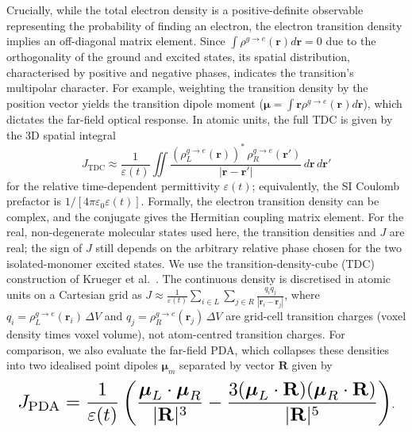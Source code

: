 \documentclass[journal=jpcbfk, manuscript=article, layout=twocolumn, doi=true]{achemso}
\begin{document}
Crucially, while the total electron density is a positive-definite observable representing the probability of finding an electron, the electron transition density implies an off-diagonal matrix element. Since $\int \rho^{g\to e}(\mathbf{r}) d\mathbf{r} = 0$ due to the orthogonality of the ground and excited states, its spatial distribution, characterised by positive and negative phases, indicates the transition's multipolar character. For example, weighting the transition density by the position vector yields the transition dipole moment ($\boldsymbol{\mu} = \int \mathbf{r} \rho^{g \to e}(\mathbf{r}) d\mathbf{r}$), which dictates the far-field optical response. In atomic units, the full TDC is given by the 3D spatial integral
\begin{equation}
    J_{\mathrm{TDC}} \approx \frac{1}{\varepsilon(t)}\iint \frac{\left(\rho^{g\to e}_L(\mathbf r)\right)^*\,\rho^{g\to e}_R(\mathbf r')}{|\mathbf r-\mathbf r'|} \,d\mathbf r\,d\mathbf r'
    \label{eq:J_integral}
\end{equation}
for the relative time-dependent permittivity $\varepsilon(t)$; equivalently, the SI Coulomb prefactor is $1/[4\pi\varepsilon_0\varepsilon(t)]$.
Formally, the electron transition density can be complex, and the conjugate gives the Hermitian coupling matrix element. For the real, non-degenerate molecular states used here, the transition densities and $J$ are real; the sign of $J$ still depends on the arbitrary relative phase chosen for the two isolated-monomer excited states. We use the transition-density-cube (TDC) construction of Krueger et al.~\cite{krueger1998}. The continuous density is discretised in atomic units on a Cartesian grid as $J \approx\frac{1}{\varepsilon(t)}\sum_{i\in L}\sum_{j\in R}\frac{q_i q_j}{|\mathbf r_i-\mathbf r_j|}$, where $q_i=\rho^{g\to e}_L(\mathbf r_i)\,\Delta V$ and $q_j=\rho^{g\to e}_R(\mathbf r_j)\,\Delta V$ are grid-cell transition charges (voxel density times voxel volume), not atom-centred transition charges. For comparison, we also evaluate the far-field PDA, which collapses these densities into two idealised point dipoles $\boldsymbol{\mu}_m$ separated by vector $\mathbf{R}$ given by
\begin{equation} \label{eq:J_PD}
    \resizebox{.98\columnwidth}{!}{$\displaystyle
    J_{\mathrm{PDA}} = \frac{1}{\varepsilon(t)} \left( \frac{\boldsymbol{\mu}_L \cdot \boldsymbol{\mu}_R}{|\mathbf{R}|^3} - \frac{3(\boldsymbol{\mu}_L \cdot \mathbf{R})(\boldsymbol{\mu}_R \cdot \mathbf{R})}{|\mathbf{R}|^5} \right)$}.
\end{equation}
\end{document}
